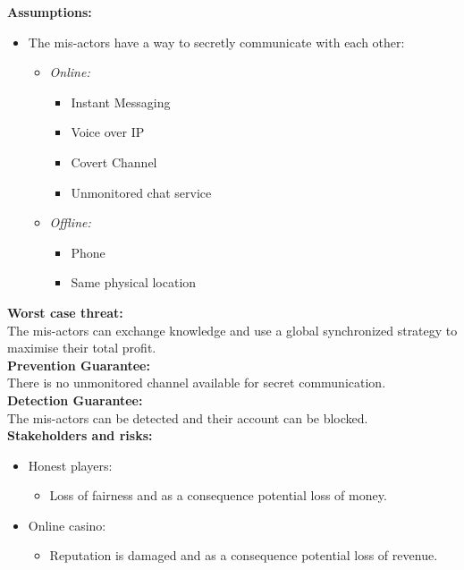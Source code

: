 \documentclass[a4paper,11pt]{report}
\begin{document}
\textbf{Assumptions:}
\begin{itemize}
\item The mis-actors have a way to secretly communicate with each other:
\begin{itemize}
\item \emph{Online:}
\begin{itemize}
\item Instant Messaging
\item Voice over IP
\item Covert Channel
\item Unmonitored chat service
\end{itemize}
\item \emph{Offline:}
\begin{itemize}
\item Phone
\item Same physical location
\end{itemize}
\end{itemize}
\end{itemize}
\textbf{Worst case threat:}\\
The mis-actors can exchange knowledge and use a global synchronized strategy to maximise their total profit. \\
\textbf{Prevention Guarantee:} \\
There is no unmonitored channel available for secret communication. \\
\textbf{Detection Guarantee:} \\
The mis-actors can be detected and their account can be blocked. \\
\textbf{Stakeholders and risks:}
\begin{itemize}
\item Honest players:
\begin{itemize}
\item Loss of fairness and as a consequence potential loss of money.
\end{itemize}
\item Online casino:
\begin{itemize}
\item Reputation is damaged and as a consequence potential loss of revenue.
\end{itemize}
\end{itemize}
\end{document}

